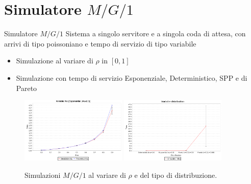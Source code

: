 \documentclass[slidestop,compress,mathserif]{beamer}
\begin{document}
\section{Simulatore $M/G/1$}
\begin{frame}{Simulatore $M/G/1$}
Sistema a singolo servitore e a singola coda di attesa, con arrivi di tipo poissoniano e tempo di servizio di tipo variabile
\begin{itemize}
	\item Simulazione al variare di $\rho$ in $[0,1]$
	\item Simulazione con tempo di servizio Esponenziale, Deterministico, SPP e di Pareto
\end{itemize}
\begin{figure}[!h]{
	\begin{center}
	   \includegraphics[width=0.45\textwidth]{figures/mg1expmu2.png}
	   \includegraphics[width=0.45\textwidth]{figures/mg1dists.png}
	\end{center}}
	\caption{Simulazioni $M/G/1$ al variare di $\rho$ e del tipo di distribuzione.}
	\label{fig:random}
\end{figure}
\end{frame}
\end{document}
